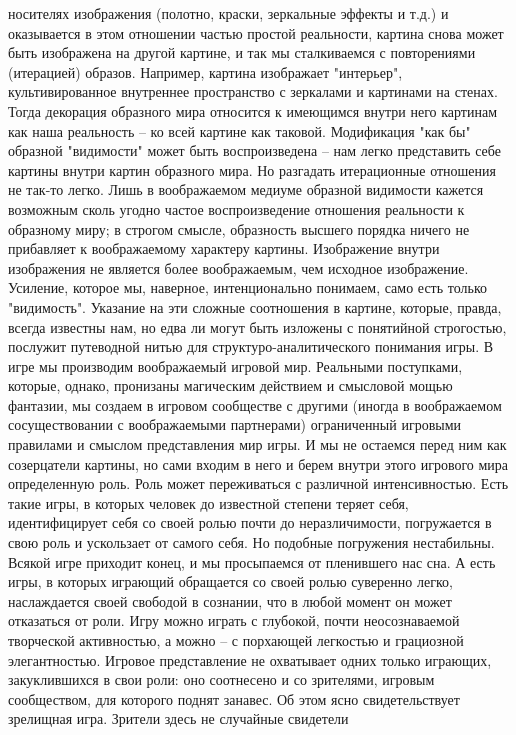 \documentclass[12pt]{article}
\begin{document}
носителях изображения (полотно, краски, зеркальные эффекты и т.д.) и оказывается в этом отношении частью
простой  реальности,  картина  снова  может  быть  изображена  на  другой  картине,  и  так  мы  сталкиваемся  с
повторениями (итерацией) образов. Например, картина изображает "интерьер", культивированное внутреннее
пространство с зеркалами и картинами на стенах. Тогда декорация образного мира относится к имеющимся
внутри него картинам как наша реальность -- ко всей картине как таковой. Модификация "как бы" образной
"видимости" может быть воспроизведена -- нам легко представить себе картины внутри картин образного мира.
Но разгадать итерационные отношения не так-то легко. Лишь в воображаемом медиуме образной видимости
кажется возможным сколь угодно частое воспроизведение отношения реальности к образному миру; в строгом
смысле, образность высшего порядка ничего не прибавляет к воображаемому характеру картины. Изображение
внутри  изображения  не  является  более  воображаемым,  чем  исходное  изображение.  Усиление,  которое  мы,
наверное, интенционально понимаем, само есть только "видимость". Указание на эти сложные соотношения в
картине, которые, правда, всегда известны нам, но едва ли могут быть изложены с понятийной строгостью,
послужит  путеводной  нитью  для  структуро-аналитического  понимания  игры.  В  игре  мы  производим
воображаемый игровой мир. Реальными поступками, которые, однако, пронизаны магическим действием и
смысловой  мощью  фантазии,  мы  создаем  в  игровом  сообществе  с  другими  (иногда  в  воображаемом
сосуществовании с воображаемыми партнерами) ограниченный игровыми правилами и смыслом представления
мир игры. И мы не остаемся перед ним как созерцатели картины, но сами входим в него и берем внутри этого
игрового мира определенную роль. Роль может переживаться с различной интенсивностью. Есть такие игры, в
которых  человек  до  известной  степени  теряет  себя,  идентифицирует  себя  со  своей  ролью  почти  до
неразличимости, погружается в свою роль и ускользает от самого себя. Но подобные погружения нестабильны.
Всякой игре приходит конец, и мы просыпаемся от пленившего нас сна. А есть игры, в которых играющий
обращается со своей ролью суверенно легко, наслаждается своей свободой в сознании, что в любой момент он
может отказаться от роли. Игру можно играть с глубокой, почти неосознаваемой творческой активностью, а
можно -- с порхающей легкостью и грациозной элегантностью. Игровое представление не охватывает одних
только играющих, закуклившихся в свои роли: оно соотнесено и со зрителями, игровым сообществом, для
которого поднят занавес. Об этом ясно свидетельствует зрелищная игра. Зрители здесь не случайные свидетели
\end{document}
